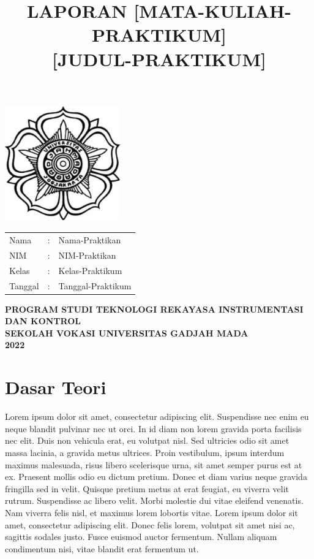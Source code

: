 \documentclass[12 pt]{article}
\title{\large \textbf{LAPORAN [MATA-KULIAH-PRAKTIKUM]} \\ \textbf{[JUDUL-PRAKTIKUM]}\linebreak}
\author{}
\date{}
\begin{document}
\clearpage
\maketitle
\thispagestyle{empty} %

\begin{center}
\includegraphics[width=5cm,height=5cm]{cover_laporan/logo_ugm.png}
\end{center}

\vspace{1 cm}

\begin{center}
\begin{tabular}{lcl}
Nama & : & Nama-Praktikan \\
NIM & : & NIM-Praktikan\\
Kelas & : & Kelas-Praktikum\\
Tanggal & : & Tanggal-Praktikum
\end{tabular}
\newline
\newline
\newline
\newline
\newline
\large{\textbf{PROGRAM STUDI TEKNOLOGI REKAYASA INSTRUMENTASI DAN KONTROL}} \\
\textbf{SEKOLAH VOKASI UNIVERSITAS GADJAH MADA} \\
\textbf{2022}
\end{center}

\pagebreak

\section{Dasar Teori}

Lorem ipsum dolor sit amet, consectetur adipiscing elit. Suspendisse nec enim eu neque blandit pulvinar nec ut orci. In id diam non lorem gravida porta facilisis nec elit. Duis non vehicula erat, eu volutpat nisl. Sed ultricies odio sit amet massa lacinia, a gravida metus ultrices. Proin vestibulum, ipsum interdum maximus malesuada, risus libero scelerisque urna, sit amet semper purus est at ex. Praesent mollis odio eu dictum pretium. Donec et diam varius neque gravida fringilla sed in velit. Quisque pretium metus at erat feugiat, eu viverra velit rutrum. Suspendisse ac libero velit. Morbi molestie dui vitae eleifend venenatis. Nam viverra felis nisl, et maximus lorem lobortis vitae. Lorem ipsum dolor sit amet, consectetur adipiscing elit. Donec felis lorem, volutpat sit amet nisi ac, sagittis sodales justo. Fusce euismod auctor fermentum. Nullam aliquam condimentum nisi, vitae blandit erat fermentum ut.
\end{document}
